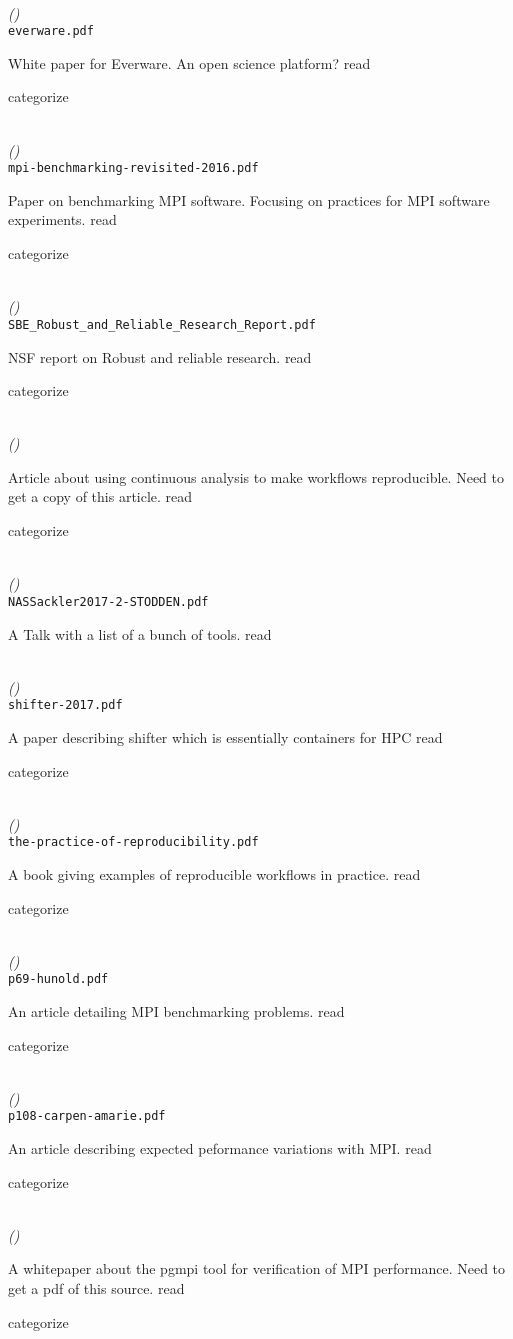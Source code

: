 \documentclass{article}
\newcommand{\Read}{
	\gls{read}
}
\newcommand{\categorize}{
	\gls{categorize}
}
\newenvironment{refdef}[2] {
	\noindent \textbf{\citetitle{#1}} \cite{#1}\\ \citejournalorbooktitle{#1} \textit{(\citeyear{#1})}\\ \texttt{#2} \vspace{0.2in} \par 
} {
\vspace{0.2in}
}
\begin{document}
\begin{refdef}{everware}{everware.pdf}
White paper for Everware. An open science platform? \Read \categorize
\end{refdef}

\begin{refdef}{mpi-benchmarking-revisited-2016}{mpi-benchmarking-revisited-2016.pdf}
Paper on benchmarking MPI software. Focusing on practices for MPI software experiments. \Read \categorize
\end{refdef}

\begin{refdef}{nsf-sbe-robust-reliable-science-2015}{SBE\_Robust\_and\_Reliable\_Research\_Report.pdf}
NSF report on Robust and reliable research. \Read \categorize
\end{refdef}

\begin{refdef}{Beaulieu-Jones2017}{}
Article about using continuous analysis to make workflows reproducible. Need to get a copy of this article. \Read \categorize
\end{refdef}

\begin{refdef}{stodden-sharing-reproducibility-talk-2017}{NASSackler2017-2-STODDEN.pdf}
A Talk with a list of a bunch of tools. \Read \cateorize
\end{refdef}

\begin{refdef}{shifter-2017}{shifter-2017.pdf}
A paper describing shifter which is essentially containers for HPC \Read \categorize
\end{refdef}

\begin{refdef}{rokem-repro-human-mri}{the-practice-of-reproducibility.pdf}
A book giving examples of reproducible workflows in practice. \Read \categorize
\end{refdef}

\begin{refdef}{hunold-repro-mpi-benchmarking-2014}{p69-hunold.pdf}
An article detailing MPI benchmarking problems. \Read \categorize
\end{refdef}

\begin{refdef}{carpen-amarie-mpi-performance-2016}{p108-carpen-amarie.pdf}
An article describing expected peformance variations with MPI. \Read \categorize
\end{refdef}

\begin{refdef}{pgmpi}{}
A whitepaper about the pgmpi tool for verification of MPI performance. Need to get a pdf of this source. \Read \categorize
\end{refdef}
\end{document}
